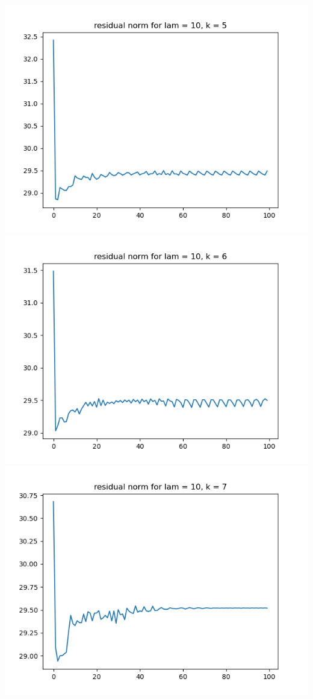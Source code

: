\documentclass{article}
\begin{document}
\begin{enumerate}
\begin{enumerate}
\begin{center}
			\includegraphics[scale=.3]{hw7p1 residual norm for lamcount = 3, k = 5}
			\includegraphics[scale=.3]{hw7p1 residual norm for lamcount = 3, k = 6}
			\includegraphics[scale=.3]{hw7p1 residual norm for lamcount = 3, k = 7}
		\end{center}
	

\end{enumerate}
\end{enumerate}
\end{document}

